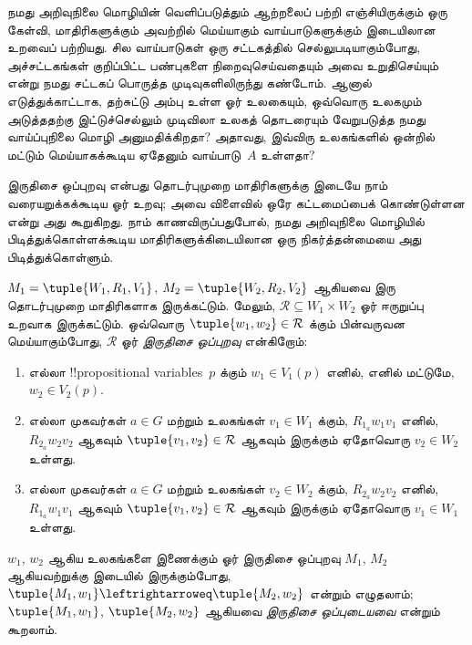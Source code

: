 \documentclass[../../../include/open-logic-section]{subfiles}
\begin{document}


நமது அறிவுநிலை மொழியின் வெளிப்படுத்தும் ஆற்றலைப் பற்றி எஞ்சியிருக்கும் ஒரு
கேள்வி, மாதிரிகளுக்கும் அவற்றில் மெய்யாகும் வாய்பாடுகளுக்கும் இடையிலான உறவைப்
பற்றியது. சில வாய்பாடுகள் ஒரு சட்டகத்தில் செல்லுபடியாகும்போது, அச்சட்டகங்கள்
குறிப்பிட்ட பண்புகளை நிறைவுசெய்வதையும் அவை உறுதிசெய்யும் என்று நமது சட்டகப்
பொருத்த முடிவுகளிலிருந்து கண்டோம். ஆனால் எடுத்துக்காட்டாக, தற்சுட்டு அம்பு
உள்ள ஓர் உலகையும், ஒவ்வொரு உலகமும் அடுத்ததற்கு இட்டுச்செல்லும் முடிவிலா
உலகத் தொடரையும் வேறுபடுத்த நமது வாய்ப்புநிலை மொழி அனுமதிக்கிறதா? அதாவது,
இவ்விரு உலகங்களில் ஒன்றில் மட்டும் மெய்யாகக்கூடிய ஏதேனும் வாய்பாடு~$A$
உள்ளதா?

இருதிசை ஒப்புறவு என்பது தொடர்புமுறை மாதிரிகளுக்கு இடையே நாம் வரையறுக்கக்கூடிய
ஓர் உறவு; அவை விளைவில் ஒரே கட்டமைப்பைக் கொண்டுள்ளன என்று அது கூறுகிறது.
நாம் காணவிருப்பதுபோல், நமது அறிவுநிலை மொழியில் பிடித்துக்கொள்ளக்கூடிய
மாதிரிகளுக்கிடையிலான ஒரு நிகர்த்தன்மையை அது பிடித்துக்கொள்ளும்.

\begin{defn}[இருதிசை ஒப்புறவு]
$M_1 = \tuple{W_1, R_1, V_1}$, $M_2 = \tuple{W_2, R_2, V_2}$ ஆகியவை இரு
தொடர்புமுறை மாதிரிகளாக இருக்கட்டும். மேலும், $\mathcal{R} \subseteq W_1
\times W_2$ ஓர் ஈருறுப்பு உறவாக இருக்கட்டும். ஒவ்வொரு
$\tuple{w_1, w_2} \in \mathcal{R}$ க்கும் பின்வருவன மெய்யாகும்போது,
$\mathcal{R}$ ஓர் \emph{இருதிசை ஒப்புறவு} என்கிறோம்:

\begin{enumerate}
  \item எல்லா !!{propositional variable}s~$p$ க்கும் $w_1 \in V_1(p)$
  எனில், எனில் மட்டுமே, $w_2 \in V_2(p)$.
  \item எல்லா முகவர்கள் $a \in G$ மற்றும் உலகங்கள் $v_1 \in W_1$ க்கும்,
  $R_{1_a} w_1 v_1$ எனில், $R_{2_a} w_2 v_2$ ஆகவும்
  $\tuple{v_1, v_2} \in \mathcal{R}$ ஆகவும் இருக்கும் ஏதோவொரு
  $v_2 \in W_2$ உள்ளது.
  \item எல்லா முகவர்கள் $a \in G$ மற்றும் உலகங்கள் $v_2 \in W_2$ க்கும்,
   $R_{2_a} w_2 v_2$ எனில், $R_{1_a} w_1 v_1$ ஆகவும்
   $\tuple{v_1, v_2} \in \mathcal{R}$ ஆகவும் இருக்கும் ஏதோவொரு
   $v_1 \in W_1$ உள்ளது.
\end{enumerate}

$w_1$, $w_2$ ஆகிய உலகங்களை இணைக்கும் ஓர் இருதிசை ஒப்புறவு $M_1$, $M_2$
ஆகியவற்றுக்கு இடையில் இருக்கும்போது, $\tuple{M_1, w_1} \leftrightarroweq
\tuple{M_2, w_2}$ என்றும் எழுதலாம்; $\tuple{M_1, w_1}$,
$\tuple{M_2, w_2}$ ஆகியவை \emph{இருதிசை ஒப்புடையவை} என்றும் கூறலாம்.
\end{defn}
\end{document}

